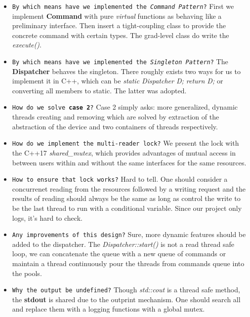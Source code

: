 \documentclass[a4paper]{article}
\begin{document}
\begin{itemize}
    \item \texttt{By which means have we implemented the \textit{Command Pattern}?}
        First we implement \textbf{Command} with pure \textsl{virtual} functions
        as behaving like a preliminary interface. Then insert a tight-coupling
        class to provide the concrete command with certain types. The grad-level
        class do write the \textsl{execute()}.
    \item \texttt{By which means have we implemented the \textit{Singleton Pattern}?}
        The \textbf{Dispatcher} behaves the singleton. There roughly exists two ways
        for us to implement it in C++, which can be \textsl{static Dispatcher D; return D;}
        or converting all members to static. The latter was adopted.
    \item \texttt{How do we solve \textbf{case 2}?}
        Case 2 simply asks: more generalized, dynamic threads creating and removing
        which are solved by extraction of the abstraction of the device and
        two containers of threads respectively.
    \item \texttt{How do we implement the multi-reader lock?}
        We present the lock with the C++17 \textsl{shared\_mutex}, which provides
        advantages of mutual access in between users within and without the same
        interfaces for the same resources.
    \item \texttt{How to ensure that lock works?} Hard to tell. One should consider
        a concurrenet reading from the resources followed by a writing request and
        the results of reading should always be the same as long as control the
        write to be the last thread to run with a conditional variable. Since our project
        only logs, it's hard to check.
    \item \texttt{Any improvements of this design?}
        Sure, more dynamic features should be added to the dispatcher. The
        \textsl{Dispatcher::start()} is not a read thread safe loop, we can
        concatenate the queue with a new queue of commands or maintain
        a thread continuously pour the threads from commands queue into the pools.
    \item \texttt{Why the output be undefined?}
        Though \textsl{std::cout} is a thread safe method,
        the \textbf{stdout} is shared due to the outprint mechanism. One should
        search all and replace them with a logging functions with a global mutex.
\end{itemize}
\end{document}
